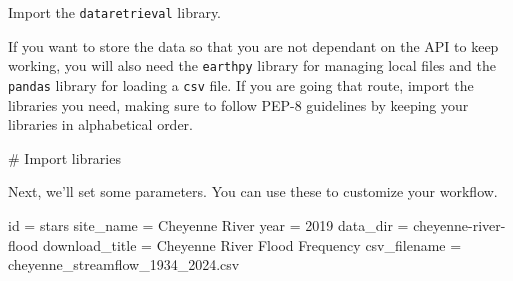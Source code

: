 \documentclass[
  letterpaper,
  DIV=11,
  numbers=noendperiod,
  oneside]{scrreprt}
\newenvironment{Shaded}{\begin{snugshade}}{\end{snugshade}}
\newcommand{\BuiltInTok}[1]{\textcolor[rgb]{0.00,0.23,0.31}{#1}}
\newcommand{\CommentTok}[1]{\textcolor[rgb]{0.37,0.37,0.37}{#1}}
\newcommand{\DecValTok}[1]{\textcolor[rgb]{0.68,0.00,0.00}{#1}}
\newcommand{\NormalTok}[1]{\textcolor[rgb]{0.00,0.23,0.31}{#1}}
\newcommand{\OperatorTok}[1]{\textcolor[rgb]{0.37,0.37,0.37}{#1}}
\newcommand{\StringTok}[1]{\textcolor[rgb]{0.13,0.47,0.30}{#1}}
\begin{document}
\begin{tcolorbox}[enhanced jigsaw, colbacktitle=quarto-callout-color!10!white, opacityback=0, bottomtitle=1mm, toptitle=1mm, bottomrule=.15mm, left=2mm, colframe=quarto-callout-color-frame, leftrule=.75mm, opacitybacktitle=0.6, colback=white, rightrule=.15mm, toprule=.15mm, breakable, titlerule=0mm, title=\textcolor{quarto-callout-color}{\faInfo}\hspace{0.5em}{Try It}, coltitle=black, arc=.35mm]

Import the \texttt{dataretrieval} library.

If you want to store the data so that you are not dependant on the API
to keep working, you will also need the \texttt{earthpy} library for
managing local files and the \texttt{pandas} library for loading a
\texttt{csv} file. If you are going that route, import the libraries you
need, making sure to follow PEP-8 guidelines by keeping your libraries
in alphabetical order.

\end{tcolorbox}

\begin{Shaded}
\begin{Highlighting}[]
\CommentTok{\# Import libraries}
\end{Highlighting}
\end{Shaded}

Next, we'll set some parameters. You can use these to customize your
workflow.

\begin{Shaded}
\begin{Highlighting}[]
\BuiltInTok{id} \OperatorTok{=} \StringTok{\textquotesingle{}stars\textquotesingle{}}
\NormalTok{site\_name }\OperatorTok{=} \StringTok{\textquotesingle{}Cheyenne River\textquotesingle{}}
\NormalTok{year }\OperatorTok{=} \DecValTok{2019}
\NormalTok{data\_dir }\OperatorTok{=} \StringTok{\textquotesingle{}cheyenne{-}river{-}flood\textquotesingle{}}
\NormalTok{download\_title }\OperatorTok{=} \StringTok{\textquotesingle{}Cheyenne River Flood Frequency\textquotesingle{}}
\NormalTok{csv\_filename }\OperatorTok{=} \StringTok{\textquotesingle{}cheyenne\_streamflow\_1934\_2024.csv\textquotesingle{}}
\end{Highlighting}
\end{Shaded}
\end{document}
